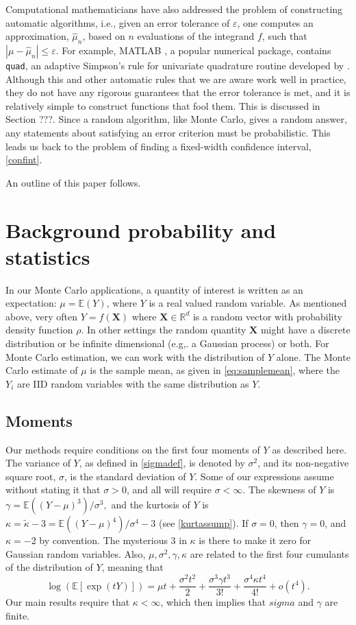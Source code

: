 \documentclass[graybox]{svmult}
\newcommand\real{\mathbb{R}}
\newcommand\e{\mathbb{E}}
\newcommand{\bsX}{\boldsymbol{X}}
\newcommand{\abs}[1]{\left|#1\right|}
\newcommand{\hmu}{\hat{\mu}}
\newcommand{\tkappa}{\tilde{\kappa}}
\def\abs#1{\ensuremath{\left \lvert #1 \right \rvert}}
\begin{document}
Computational mathematicians have also addressed the problem of constructing automatic algorithms, i.e., given an error tolerance of $\varepsilon$, one computes an approximation, $\hmu_n$, based on $n$ evaluations of the integrand $f$, such that $\abs{\mu-\hmu_n} \le \varepsilon$. For example, MATLAB \citep{MAT7.12}, a popular numerical package, contains {\tt quad}, an adaptive Simpson's rule for univariate quadrature routine developed by \cite{GanGau00a}. Although this and other automatic rules that we are aware work well in practice, they do not have any rigorous guarantees that the error tolerance is met, and it is relatively simple to construct functions that fool them.  This is discussed in Section ???.  Since a random algorithm, like Monte Carlo, gives a random answer, any statements about satisfying an error criterion must be probabilistic.  This leads us back to the problem of finding a fixed-width confidence interval, \eqref{confint}.

An outline of this paper follows.




\section{Background probability and statistics}\label{sec:background}

In our Monte Carlo applications, a quantity of interest
is written as an expectation: $\mu = \e(Y)$, where $Y$
is a real valued random variable.  As mentioned above, very often
$Y = f(\bsX)$ where $\bsX\in\real^d$ is a random vector
with probability density function $\rho$. In other settings the random quantity $\bsX$ might
have a discrete distribution or be infinite dimensional (e.g,. a Gaussian
process) or both. For Monte Carlo estimation, we can
work with the distribution of $Y$ alone. The Monte Carlo estimate of $\mu$ is the sample mean, as given in \eqref{eq:samplemean}, where the $Y_i$ are IID random variables with the same distribution as $Y$.

\subsection{Moments}

Our methods require conditions on the first four moments of
$Y$ as described here. The variance of $Y$, as defined in \eqref{sigmadef}, is denoted by $\sigma^2$, and its non-negative square root, $\sigma$, is the standard deviation of $Y$.   Some of our expressions assume without stating it that $\sigma>0$, and all will require $\sigma<\infty$.  The skewness of $Y$ is
$ \gamma = \e( (Y-\mu)^3 )/\sigma^3,$
and the kurtosis of $Y$ is
$ \kappa = \tkappa-3 = \e( (Y-\mu)^4)/\sigma^4-3$ (see \eqref{kurtassump}).  If $\sigma=0$, then $\gamma=0$, and $\kappa=-2$ by convention.
The mysterious $3$ in $\kappa$ is there to
make it zero for Gaussian random variables.
Also, $\mu,\sigma^2,\gamma,\kappa$ are related to the
first four cumulants \cite[p.??]{McC87a} of the distribution of $Y$, meaning that
\[
\log(\e[\exp(tY)]) = \mu t + \frac{\sigma^2 t^2}{2} + \frac{\sigma^3 \gamma t^3}{3!} + \frac{\sigma^4 \kappa t^4}{4!} + o(t^4).
\]
Our main results require that $\kappa<\infty$, which then implies that $sigma$ and $\gamma$ are finite.
\end{document}
